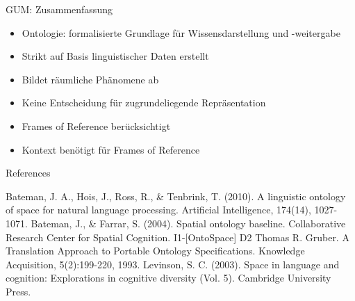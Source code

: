 \documentclass[12pt,a4paper]{beamer}
\begin{document}
\begin{frame}{GUM: Zusammenfassung}
\begin{itemize}
\item Ontologie: formalisierte Grundlage für Wissensdarstellung und -weitergabe
\item Strikt auf Basis linguistischer Daten erstellt
\item Bildet räumliche Phänomene ab
\item Keine Entscheidung für zugrundeliegende Repräsentation
\item Frames of Reference berücksichtigt
\item Kontext benötigt für Frames of Reference
\end{itemize}
\end{frame}










\begin{frame}[allowframebreaks]{References}
\begin{thebibliography}{-}
 Bateman, J. A., Hois, J., Ross, R., \& Tenbrink, T. (2010). A linguistic ontology of space for natural language processing. Artificial Intelligence, 174(14), 1027-1071.
 Bateman, J., \& Farrar, S. (2004). Spatial ontology baseline. Collaborative Research Center for Spatial Cognition. I1-[OntoSpace] D2
 Thomas R. Gruber. A Translation Approach to Portable Ontology Specifications. Knowledge Acquisition, 5(2):199-220, 1993.
 Levinson, S. C. (2003). Space in language and cognition: Explorations in cognitive diversity (Vol. 5). Cambridge University Press.
\end{thebibliography}
\end{frame}
\end{document}
